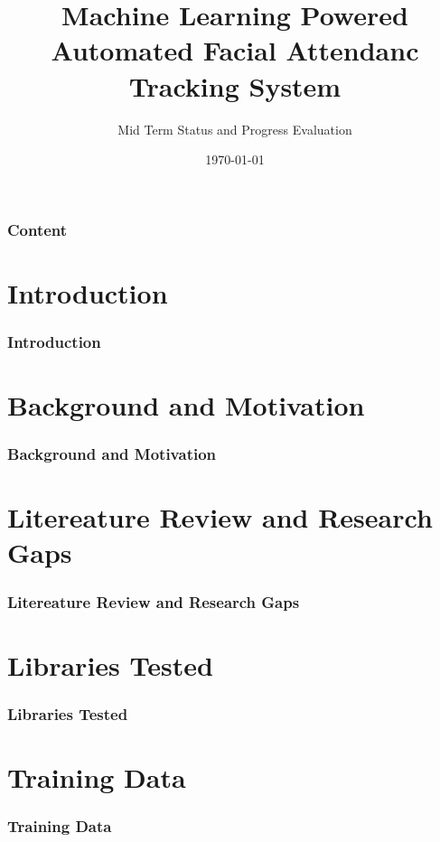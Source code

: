 \documentclass[aspectratio=169]{beamer}
\title{Machine Learning Powered Automated Facial Attendanc Tracking System}
\author{Mid Term Status and Progress Evaluation}
\date{\today}
\begin{document}
\begin{frame}
	\titlepage
\end{frame}

\begin{frame}
	\frametitle{Content}
	\tableofcontents
\end{frame}

\section{Introduction}
\begin{frame}
	\centering
	\frametitle{Introduction}
	\begin{minipage}{0.95\textwidth}
	\end{minipage}
\end{frame}

\section{Background and Motivation}
\begin{frame}
	\centering
	\frametitle{Background and Motivation}
	\begin{minipage}{0.95\textwidth}
	\end{minipage}
\end{frame}

\section{Litereature Review and Research Gaps}
\begin{frame}
	\centering
	\frametitle{Litereature Review and Research Gaps}
	\begin{minipage}{0.95\textwidth}
	\end{minipage}
\end{frame}

\section{Libraries Tested}
\begin{frame}
	\centering
	\frametitle{Libraries Tested}
	\begin{minipage}{0.95\textwidth}
	\end{minipage}
\end{frame}

\section{Training Data}
\begin{frame}
	\centering
	\frametitle{Training Data}
	\begin{minipage}{0.95\textwidth}
	\end{minipage}
\end{frame}
\end{document}
